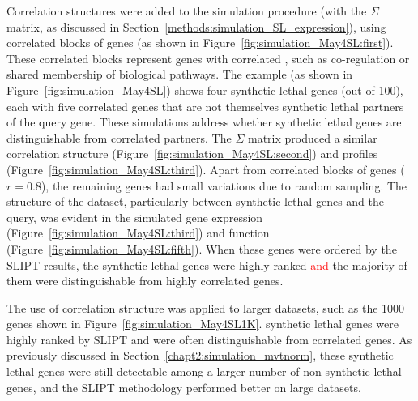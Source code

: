 Correlation structures were added to the simulation procedure (with the $\Sigma$ matrix, as discussed in Section~\ref{methods:simulation_SL_expression}), using correlated blocks of genes (as shown in Figure~\ref{fig:simulation_May4SL:first}). These correlated blocks represent genes with correlated , such as co-regulation or shared membership of biological pathways. The example (as shown in Figure~\ref{fig:simulation_May4SL}) shows four \gls{synthetic lethal} genes (out of 100), each with five correlated genes that are not themselves \gls{synthetic lethal} partners of the query gene. These simulations address whether \gls{synthetic lethal} genes are distinguishable from correlated partners. The $\Sigma$ matrix produced a similar correlation structure (Figure~\ref{fig:simulation_May4SL:second}) and  profiles (Figure~\ref{fig:simulation_May4SL:third}).  Apart from correlated blocks of genes ($r = 0.8$), the remaining genes had small variations due to random sampling. The structure of the dataset, particularly between \gls{synthetic lethal} genes and the query, was evident in the simulated \gls{gene expression} (Figure~\ref{fig:simulation_May4SL:third}) and function (Figure~\ref{fig:simulation_May4SL:fifth}). When these genes were ordered by the \gls{SLIPT} results, the \gls{synthetic lethal} genes were highly ranked \textcolor{red}{and} the majority of them were distinguishable from highly correlated genes.

The use of correlation structure was applied to larger datasets, such as the 1000 genes shown in Figure~\ref{fig:simulation_May4SL1K}. \Gls{synthetic lethal} genes were highly ranked by \gls{SLIPT} and were often distinguishable from correlated genes. As previously discussed in Section~\ref{chapt2:simulation_mvtnorm}, these \gls{synthetic lethal} genes were still detectable among a larger number of non-synthetic lethal genes, and the \gls{SLIPT} methodology performed better on large datasets.


